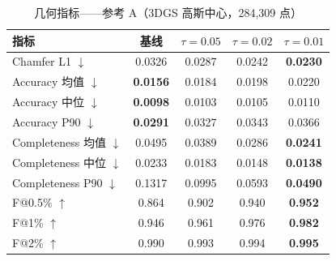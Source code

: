 \begin{table}[H]
\centering\small
\caption{几何指标——参考 A（3DGS 高斯中心，284{,}309 点）}
\label{tab:geo-refA}
\begin{tabular}{@{}lcccc@{}}
\toprule
\textbf{指标} & \textbf{基线} & $\tau{=}0.05$ & $\tau{=}0.02$ & $\tau{=}0.01$ \\
\midrule
Chamfer L1 $\downarrow$          & 0.0326 & 0.0287 & 0.0242 & \textbf{0.0230} \\
\addlinespace
Accuracy 均值 $\downarrow$       & \textbf{0.0156} & 0.0184 & 0.0198 & 0.0220 \\
Accuracy 中位 $\downarrow$       & \textbf{0.0098} & 0.0103 & 0.0105 & 0.0110 \\
Accuracy P90 $\downarrow$        & \textbf{0.0291} & 0.0327 & 0.0343 & 0.0366 \\
\addlinespace
Completeness 均值 $\downarrow$   & 0.0495 & 0.0389 & 0.0286 & \textbf{0.0241} \\
Completeness 中位 $\downarrow$   & 0.0233 & 0.0183 & 0.0148 & \textbf{0.0138} \\
Completeness P90 $\downarrow$    & 0.1317 & 0.0995 & 0.0593 & \textbf{0.0490} \\
\addlinespace
F@0.5\% $\uparrow$              & 0.864 & 0.902 & 0.940 & \textbf{0.952} \\
F@1\% $\uparrow$                & 0.946 & 0.961 & 0.976 & \textbf{0.982} \\
F@2\% $\uparrow$                & 0.990 & 0.993 & 0.994 & \textbf{0.995} \\
\bottomrule
\end{tabular}
\end{table}

